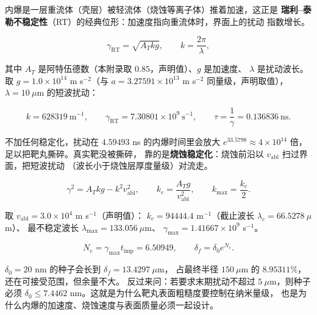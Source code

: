 内爆是一层重流体（壳层）被轻流体（烧蚀等离子体）推着加速，这正是
\textbf{瑞利--泰勒不稳定性}（RT）的经典位形：加速度指向重流体时，界面上的扰动
指数增长。

\begin{equation}
\gamma_{\mathrm{RT}} = \sqrt{A_T k g},
\qquad
k = \frac{2\pi}{\lambda},
\label{eq:app-ai-rt}
\end{equation}

其中 $A_T$ 是阿特伍德数（本附录取 $0.85$，声明值）、$g$ 是加速度、
$\lambda$ 是扰动波长。取 $g = 1.0\times10^{14}$ m s$^{-2}$（与
$a = 3.27591\times10^{13}$ m s$^{-2}$ 同量级，声明取值），
$\lambda = 10\ \mu$m 的短波扰动：

\begin{equation}
k = 628319\ \mathrm{m^{-1}},
\qquad
\gamma_{\mathrm{RT}} = 7.30801\times10^{9}\ \mathrm{s^{-1}},
\qquad
\tau = \frac{1}{\gamma} = 0.136836\ \mathrm{ns}.
\label{eq:app-ai-rtabl}
\end{equation}

不加任何稳定化，扰动在 $4.59493$ ns 的内爆时间里会放大
$e^{33.5798} \approx 4\times10^{14}$ 倍，足以把靶丸撕碎。真实靶没被撕碎，
靠的是\textbf{烧蚀稳定化}：烧蚀前沿以 $v_{\mathrm{abl}}$ 扫过界面，把短波扰动
（波长小于烧蚀层厚度量级）对流走。

\begin{equation}
\gamma^2 = A_T k g - k^2 v_{\mathrm{abl}}^2 ,
\qquad
k_c = \frac{A_T g}{v_{\mathrm{abl}}^2},
\qquad
k_{\max} = \frac{k_c}{2}.
\label{eq:app-ai-cutoff}
\end{equation}

取 $v_{\mathrm{abl}} = 3.0\times10^{4}$ m s$^{-1}$（声明值）：
$k_c = 94444.4$ m$^{-1}$（截止波长 $\lambda_c = 66.5278\ \mu$m）、
最不稳定波长 $\lambda_{\max} = 133.056\ \mu$m、
$\gamma_{\max} = 1.41667\times10^{9}$ s$^{-1}$。

\begin{equation}
N_{e} = \gamma_{\max} t_{\mathrm{imp}} = 6.50949 ,
\qquad
\delta_f = \delta_0 e^{N_e}.
\label{eq:app-ai-efold}
\end{equation}

$\delta_0 = 20$ nm 的种子会长到 $\delta_f = 13.4297\ \mu$m，
占最终半径 $150\ \mu$m 的 $8.95311\%$，还在可接受范围，但余量不大。
反过来问：若要求末期扰动不超过 $5\ \mu$m，则种子必须
$\delta_0 \le 7.4462$ nm。这就是为什么靶丸表面粗糙度要控制在纳米量级，
也是为什么内爆的加速度、烧蚀速度与表面质量必须一起设计。

